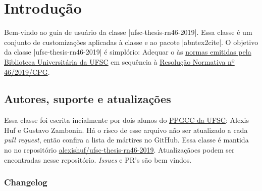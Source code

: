 \documentclass[]{ufsc-thesis-rn46-2019}
\begin{document}

\pretextual%
\imprimircapa%
\imprimirfolhaderosto*
\clearpage %

\clearpage
\imprimirfolhadecertificacao
\tableofcontents*%

\textual%
\cleardoublepage

\chapter{Introdução}

Bem-vindo ao guia de usuário da classe \mt|ufsc-thesis-rn46-2019|. Essa classe é um conjunto de customizações aplicadas à classe \href{https://ctan.org/pkg/abntex2}{\abnTeX} e ao pacote \mt|abntex2cite|. O objetivo da classe \mt|ufsc-thesis-rn46-2019| é simplório: Adequar o \abnTeX às \href{http://portal.bu.ufsc.br/normalizacao/}{normas emitidas pela Biblioteca Universitária da UFSC} em sequência à \href{https://repositorio.ufsc.br/handle/123456789/197121}{Resolução Normativa nº 46/2019/CPG}.


\section{Autores, suporte e atualizações}

Essa classe foi escrita incialmente por dois alunos do \href{http://ppgcc.posgrad.ufsc.br/}{PPGCC da UFSC}: Alexis Huf e Gustavo Zambonin. Há o risco de esse arquivo não ser atualizado a cada \textit{pull request}, então confira a lista de mártires no GitHub. Essa classe é mantida no no repositório \href{https://github.com/alexishuf/ufsc-thesis-rn46-2019/}{alexishuf/ufsc-thesis-rn46-2019}. Atualizaçãoes podem ser encontradas nesse repositório. \textit{Issues} e PR's são bem vindos.

\subsection{Changelog}
\end{document}
